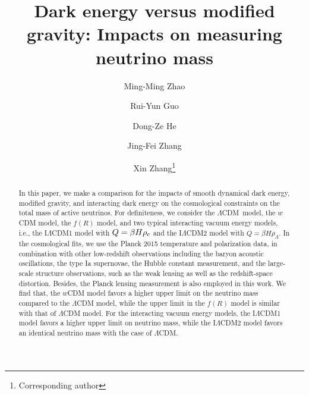 \documentclass[aps,prd,nofootinbib,amsmath,amssymb,twocolumn,superscriptaddress,10pt]{revtex4}%
\newcommand{\LCDM}{$\Lambda$CDM}
\newcommand{\ILCDM}{I$\Lambda$CDM}
\begin{document}
\title{Dark energy versus modified gravity: Impacts on measuring neutrino mass}

\author{Ming-Ming Zhao}
\author{Rui-Yun Guo}
\author{Dong-Ze He}
\author{Jing-Fei Zhang}
\author{Xin Zhang\footnote{Corresponding author}}



\begin{abstract}
In this paper, we make a comparison for the impacts of smooth dynamical dark energy, modified gravity, and interacting dark energy on the cosmological constraints on the total mass of active neutrinos. For definiteness, we consider the \LCDM\ model, the $w$CDM model, the $f(R)$ model, and two typical interacting vacuum energy models, i.e., the \ILCDM1 model with $Q=\beta H\rho_{\rm c}$ and the \ILCDM2 model with $Q=\beta H\rho_{\Lambda}$. In the cosmological fits, we use the Planck 2015 temperature and polarization data, in combination with other low-redshift observations including the baryon acoustic oscillations, the type Ia supernovae, the Hubble constant measurement, and the large-scale structure observations, such as the weak lensing as well as the redshift-space distortion. Besides, the Planck lensing measurement is also employed in this work. We find that, the $w$CDM model favors a higher upper limit on the neutrino mass compared to the $\Lambda$CDM model, while the upper limit in the $f(R)$ model is similar with that of $\Lambda$CDM model.
For the interacting vacuum energy models, the \ILCDM1 model favors a higher upper limit on neutrino mass, while the \ILCDM2 model favors an identical neutrino mass with the case of $\Lambda$CDM.


\end{abstract}
\end{document}
